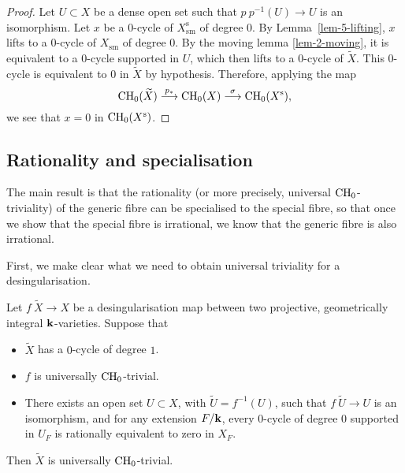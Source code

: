 \begin{proof}
    Let $U \subset X$ be a dense open set
    such that $p \: p^{-1} (U) \to U$ is an isomorphism.
    Let $x$ be a $0$-cycle of $X^{\mathrm{s}}_{\mathrm{sm}}$ of degree $0$.
    By Lemma~\ref{lem-5-lifting}, $x$ lifts to a $0$-cycle of $X_{\mathrm{sm}}$ of degree $0$.
    By the moving lemma \ref{lem-2-moving},
    it is equivalent to a $0$-cycle supported in $U$,
    which then lifts to a $0$-cycle of $\widetilde{X}$.
    This $0$-cycle is equivalent to $0$ in $\widetilde{X}$ by hypothesis.
    Therefore, applying the map
    \[ \mathrm{CH}_0 (\widetilde{X}) \overset{p_*}{\longrightarrow} \mathrm{CH}_0 (X) 
        \overset{\sigma}{\longrightarrow} \mathrm{CH}_0 (X^{\mathrm{s}}), \]
    we see that $x = 0$ in $\mathrm{CH}_0 (X^{\mathrm{s}})$.
\end{proof}


\subsection{Rationality and specialisation}

The main result is that the rationality 
(or more precisely, universal $\mathrm{CH}_0$-triviality) 
of the generic fibre 
can be specialised to the special fibre,
so that once we show that the special fibre is irrational,
we know that the generic fibre is also irrational.

First, we make clear what we need
to obtain universal triviality for a desingularisation.

\begin{lemma} \label{lem-5-crit-triv}
    Let $f \: \widetilde{X} \to X$ be a desingularisation map between 
    two projective, geometrically integral $\bbk$-varieties. Suppose that 
    \begin{itemize}
        \item
            $\widetilde{X}$ has a $0$-cycle of degree $1$.
        \item
            $f$ is universally $\mathrm{CH}_0$-trivial.
        \item
            There exists an open set $U \subset X$, with $\widetilde{U} = f^{-1} (U)$,
            such that $f \: \widetilde{U} \to U$ is an isomorphism,
            and for any extension $F/\bbk$,
            every $0$-cycle of degree $0$ supported in $U_F$
            is rationally equivalent to zero in $X_F$.
    \end{itemize}
    Then $\widetilde{X}$ is universally $\mathrm{CH}_0$-trivial.
\end{lemma}

